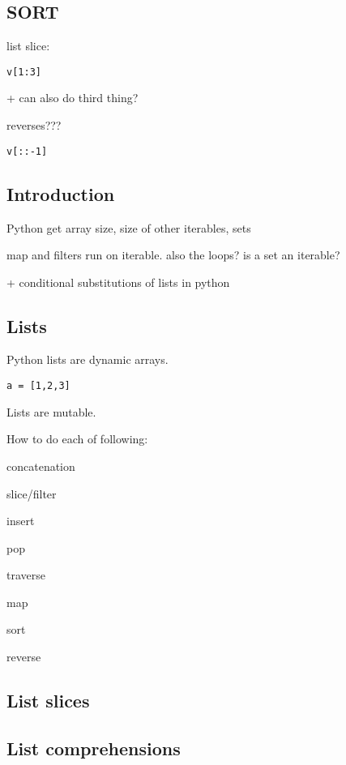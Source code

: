
\subsection{SORT}


list slice:

\begin{verbatim}
v[1:3]
\end{verbatim}


+ can also do third thing?

 reverses???
\begin{verbatim}
v[::-1]
\end{verbatim}

  
\subsection{Introduction}

Python get array size,  size of other iterables, sets

map and filters run on iterable. also the loops?
is a set an iterable?

+ conditional substitutions of lists in python

\subsection{Lists}

Python lists are dynamic arrays.

\begin{verbatim}
a = [1,2,3]
\end{verbatim}

Lists are mutable.


How to do each of following:

concatenation

slice/filter

insert

pop

traverse

map

sort

reverse

\subsection{List slices}

\subsection{List comprehensions}

